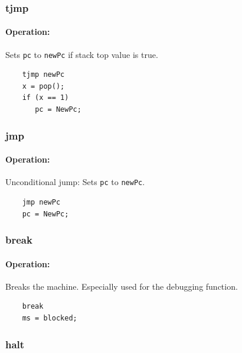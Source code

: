 \subsubsection{tjmp}

\paragraph{Operation:}
Sets \lstinline$pc$ to \lstinline$newPc$ if stack top value is true.

	\begin{lstlisting}
	tjmp newPc
	x = pop();
	if (x == 1)
	   pc = NewPc;
	\end{lstlisting}

\subsubsection{jmp}

\paragraph{Operation:}
Unconditional jump: Sets \lstinline$pc$ to \lstinline$newPc$.

	\begin{lstlisting}
	jmp newPc
	pc = NewPc;
	\end{lstlisting}

\subsubsection{break}

\paragraph{Operation:}
Breaks the machine. Especially used for the debugging function.

	\begin{lstlisting}
	break
	ms = blocked;
	\end{lstlisting}

\subsubsection{halt}

